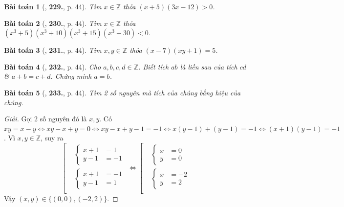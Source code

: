 \documentclass{article}
\numberwithin{equation}{section}
\newtheorem{baitoan}{Bài toán}
\begin{document}
\begin{baitoan}[\cite{Tuyen_Toan_6}, \textbf{229.}, p. 44]
	Tìm $x\in\mathbb{Z}$ thỏa $(x + 5)(3x - 12) > 0$.
\end{baitoan}

\begin{baitoan}[\cite{Tuyen_Toan_6}, \textbf{230.}, p. 44]
	Tìm $x\in\mathbb{Z}$ thỏa $(x^3 + 5)(x^3 + 10)(x^3 + 15)(x^3 + 30) < 0$.
\end{baitoan}

\begin{baitoan}[\cite{Tuyen_Toan_6}, \textbf{231.}, p. 44]
	Tìm $x,y\in\mathbb{Z}$ thỏa $(x - 7)(xy + 1) = 5$.
\end{baitoan}

\begin{baitoan}[\cite{Tuyen_Toan_6}, \textbf{232.}, p. 44]
	Cho $a,b,c,d\in\mathbb{Z}$. Biết tích $ab$ là liền sau của tích $cd$ \& $a + b = c + d$. Chứng minh $a = b$.
\end{baitoan}

\begin{baitoan}[\cite{Tuyen_Toan_6}, \textbf{233.}, p. 44]
	Tìm 2 số nguyên mà tích của chúng bằng hiệu của chúng.
\end{baitoan}

\begin{proof}[Giải]
	Gọi 2 số nguyên đó là $x,y$. Có $xy = x - y\Leftrightarrow xy - x + y = 0\Leftrightarrow xy - x + y - 1 = -1\Leftrightarrow x(y - 1) + (y - 1) = -1\Leftrightarrow(x + 1)(y - 1) = - 1$. Vì $x,y\in\mathbb{Z}$, suy ra
	\begin{equation*}
		\left[\begin{split}
			&\left\{\begin{split}
				x + 1 &= 1\\
				y - 1 &= -1
			\end{split}\right.\\
			&\left\{\begin{split}
				x + 1 &= -1\\
				y - 1 &= 1
			\end{split}\right.\\
		\end{split}\right.\Leftrightarrow\left[\begin{split}
		&\left\{\begin{split}
			x &= 0\\
			y &= 0
		\end{split}\right.\\
		&\left\{\begin{split}
			x &= -2\\
			y &= 2
		\end{split}\right.\\
	\end{split}\right.
	\end{equation*}
	Vậy $(x,y)\in\{(0,0),(-2,2)\}$.
\end{proof}
\end{document}
